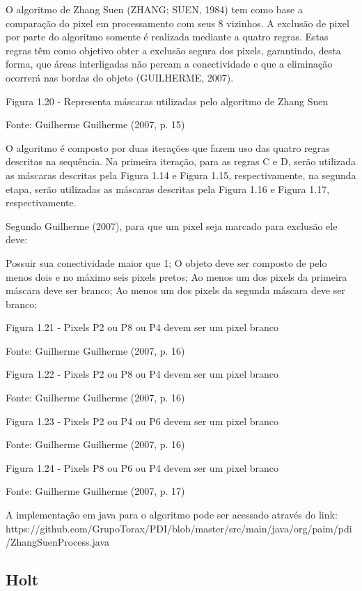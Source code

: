 \documentclass[
	12pt,				%
	oneside,			%
	a4paper,			%
	english,			%
	french,				%
	spanish,			%
	brazil,				%
	]{abntex2}
\begin{document}
O algoritmo de Zhang Suen (ZHANG; SUEN, 1984) tem como base a comparação do pixel em processamento com seus 8 vizinhos. A exclusão de pixel por parte do algoritmo somente é realizada mediante a quatro regras. Estas regras têm como objetivo obter a exclusão segura dos pixels, garantindo, desta forma, que áreas interligadas não percam a conectividade e que a eliminação ocorrerá nas bordas do objeto (GUILHERME, 2007).

Figura 1.20 - Representa máscaras utilizadas pelo algoritmo de Zhang Suen

Fonte: Guilherme Guilherme (2007, p. 15)

O algoritmo é composto por duas iterações que fazem uso das quatro regras descritas na sequência. Na primeira iteração, para as regras C e D, serão utilizada as máscaras descritas pela Figura 1.14 e Figura 1.15, respectivamente, na segunda etapa, serão utilizadas as máscaras descritas pela Figura 1.16 e Figura 1.17, respectivamente.

Segundo Guilherme (2007), para que um pixel seja marcado para exclusão ele deve:

Possuir sua conectividade maior que 1;
O objeto deve ser composto de pelo menos dois e no máximo seis pixels pretos;
Ao menos um dos pixels da primeira máscara deve ser branco;
Ao menos um dos pixels da segunda máscara deve ser branco;

Figura 1.21 - Pixels P2 ou P8 ou P4 devem ser um pixel branco 

Fonte: Guilherme Guilherme (2007, p. 16)

Figura 1.22 - Pixels P2 ou P8 ou P4 devem ser um pixel branco

Fonte: Guilherme Guilherme (2007, p. 16)

Figura 1.23 - Pixels P2 ou P4 ou P6 devem ser um pixel branco

Fonte: Guilherme Guilherme (2007, p. 16)

Figura 1.24 - Pixels P8 ou P6 ou P4 devem ser um pixel branco

Fonte: Guilherme Guilherme (2007, p. 17)

A implementação em java para o algoritmo pode ser acessado através do link:
https://github.com/GrupoTorax/PDI/blob/master/src/main/java/org/paim/pdi/ZhangSuenProcess.java 

\subsection{Holt}    
\end{document}
